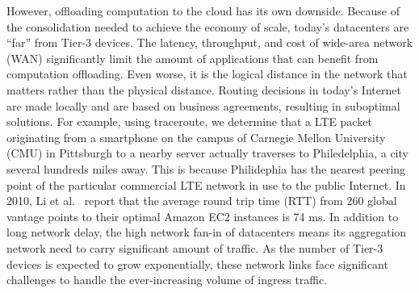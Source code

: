 However, offloading computation to the cloud has its own downside. Because of
the consolidation needed to achieve the economy of scale, today's datacenters
are ``far'' from Tier-3 devices. The latency, throughput, and cost of wide-area
network (WAN) significantly limit the amount of applications that can benefit
from computation offloading. Even worse, it is the logical distance in the
network that matters rather than the physical distance. Routing decisions in
today's Internet are made locally and are based on business agreements,
resulting in suboptimal solutions. For example, using traceroute, we determine
that a LTE packet originating from a smartphone on the campus of Carnegie Mellon
University (CMU) in Pittsburgh to a nearby server actually traverses to
Philedelphia, a city several hundreds miles away. This is because Philidephia
has the nearest peering point of the particular commercial LTE network in use to
the public Internet. In 2010, Li et al.~\cite{li2010cloudcmp} report that the
average round trip time (RTT) from 260 global vantage points to their optimal
Amazon EC2 instances is 74 ms. In addition to long network delay, the high
network fan-in of datacenters means its aggregation network need to carry
significant amount of traffic. As the number of Tier-3 devices is expected to
grow exponentially, these network links face significant challenges to handle
the ever-increasing volume of ingress traffic. 

